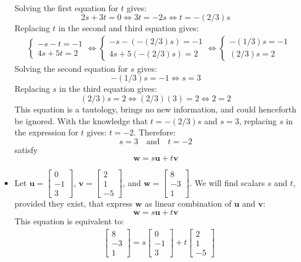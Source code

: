 \documentclass{article}
\begin{document}
\begin{itemize}
\begin{align*}
\end{align*}
Solving the first equation for \(t\) gives:
\[2s + 3t = 0 \iff 3t = -2s \iff t = -(2/3)s\]
Replacing \(t\) in the second and third equation gives:
\begin{align*}
& \left\{\begin{array}{c} -s - t = -1 \\ 4s + 5t = 2 \end{array}\right. 
\iff \left\{\begin{array}{c} -s - (-(2/3)s) = -1 \\ 4s + 5(-(2/3)s) = 2 \end{array}\right. 
\iff \left\{\begin{array}{c} -(1/3)s = -1 \\ (2/3)s = 2 \end{array}\right.  
\end{align*} 
Solving the second equation for \(s\) gives:
\[-(1/3)s = -1 \iff s = 3\]
Replacing \(s\) in the third equation gives:
\[(2/3)s = 2 \iff (2/3)(3) = 2 \iff 2 = 2\]
This equation is a tautology, brings no new information, and could henceforth be ignored. With the knowledge that \(t = -(2/3)s\) and \(s = 3\), replacing \(s\) in the expression for \(t\) gives:
\(t = -2\). Therefore:
\[s = 3 \quad\text{and}\quad t = -2\]  
satisfy
\[\mathbf{w} = s\mathbf{u} + t\mathbf{v}\]
\item Let \(\mathbf{u} = \begin{bmatrix} 0 \\ -1 \\ 3 \end{bmatrix}\), \(\mathbf{v} = \begin{bmatrix} 2 \\ 1 \\ -5 \end{bmatrix}\), and \(\mathbf{w} = \begin{bmatrix} 8 \\ -3 \\ 1 \end{bmatrix}\). We will find scalars \(s\) and \(t\), provided they exist, that express \(\mathbf{w}\) as linear combination of \(\mathbf{u}\) and \(\mathbf{v}\):
\[\mathbf{w} = s\mathbf{u} + t\mathbf{v}\]
This equation is equivalent to:
\begin{align*}
& \begin{bmatrix} 8 \\ -3 \\ 1 \end{bmatrix} = s\begin{bmatrix} 0 \\ -1 \\ 3 \end{bmatrix} + t\begin{bmatrix} 2 \\ 1 \\ -5 \end{bmatrix} 

\end{align*}
\end{itemize}
\end{document}
